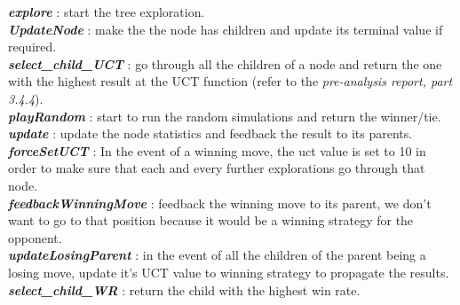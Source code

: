 \noindent
\textit{\textbf{explore}} : start the tree exploration.
\medskip\\
\textit{\textbf{UpdateNode}} : make the the node has children and update its terminal value if required.
\medskip\\
\textit{\textbf{select\_child\_UCT}} : go through all the children of a node and return the one with the highest result at the UCT function (refer to the \textit{pre-analysis report, part 3.4.4}).
\medskip\\
\textit{\textbf{playRandom}} : start to run the random simulations and return the winner/tie.
\medskip\\
\textit{\textbf{update}} : update the node statistics and feedback the result to its parents.
\medskip\\
\textit{\textbf{forceSetUCT}} : In the event of a winning move, the uct value is set to 10 in order to make sure that each and every further explorations go through that node.
\medskip\\
\textit{\textbf{feedbackWinningMove}} : feedback the winning move to its parent, we don't want to go to that position because it would be a winning strategy for the opponent.
\medskip\\
\textit{\textbf{updateLosingParent}} : in the event of all the children of the parent being a losing move, update it's UCT value to winning strategy to propagate the results.
\medskip\\
\textit{\textbf{select\_child\_WR}} : return the child with the highest win rate.\\
